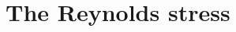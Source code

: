 \documentclass[12pt,a4paper,openany]{My_book}
\begin{document}
\section{The Reynolds stress}


% 
% 
% 
% 
% 




\end{document}
